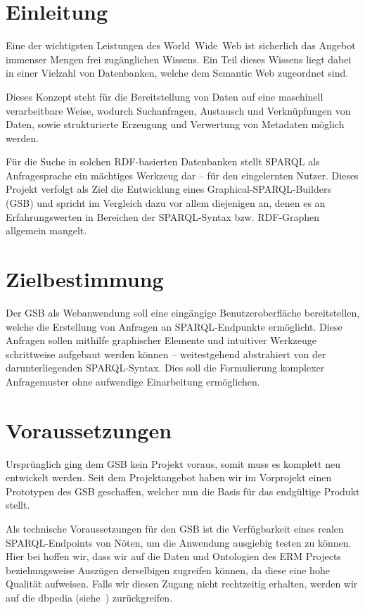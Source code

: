 \section{Einleitung}
Eine der wichtigsten Leistungen des World~Wide~Web ist sicherlich das
Angebot immenser Mengen frei zugänglichen Wissens.
Ein Teil dieses Wissens liegt dabei in einer Vielzahl von Datenbanken,
welche dem Semantic Web zugeordnet sind.

Dieses Konzept steht für die Bereitstellung von Daten auf eine
maschinell verarbeitbare Weise, wodurch Suchanfragen, Austausch und
Verknüpfungen von Daten, sowie strukturierte Erzeugung und Verwertung
von Metadaten möglich werden.

Für die Suche in solchen RDF-basierten Datenbanken stellt SPARQL als Anfragesprache ein mächtiges Werkzeug dar -- für den eingelernten Nutzer. Dieses Projekt verfolgt als Ziel die Entwicklung eines Graphical-SPARQL-Builders (GSB) und spricht im Vergleich dazu vor allem diejenigen an, denen es an Erfahrungswerten in Bereichen der SPARQL-Syntax bzw. RDF-Graphen allgemein mangelt.


\section{Zielbestimmung}
Der GSB als Webanwendung soll eine eingängige Benutzeroberfläche
bereitstellen, welche die Erstellung von Anfragen an SPARQL-Endpunkte
ermöglicht. Diese Anfragen sollen mithilfe graphischer Elemente und
intuitiver Werkzeuge schrittweise aufgebaut werden können --
weitestgehend abstrahiert von der darunterliegenden
SPARQL-Syntax. Dies soll die Formulierung komplexer Anfragemuster ohne
aufwendige Einarbeitung ermöglichen.

\section{Voraussetzungen}
Ursprünglich ging dem GSB kein Projekt voraus, somit muss es komplett
neu entwickelt werden.
Seit dem Projektangebot haben wir im Vorprojekt einen Prototypen des
GSB geschaffen, welcher nun die Basis für das endgültige Produkt
stellt.

Als technische Voraussetzungen für den GSB ist die Verfügbarkeit eines
realen SPARQL-Endpoints von Nöten, um die Anwendung ausgiebig testen
zu können. Hier bei hoffen wir, dass wir auf die Daten und Ontologien
des ERM Projects~\cite{aksw} beziehungsweise
Auszügen derselbigen zugreifen können, da diese eine hohe Qualität
aufweisen. Falls wir diesen Zugang nicht rechtzeitig erhalten, werden
wir auf die dbpedia (siehe~\cite{dbpedia}) zurückgreifen.

